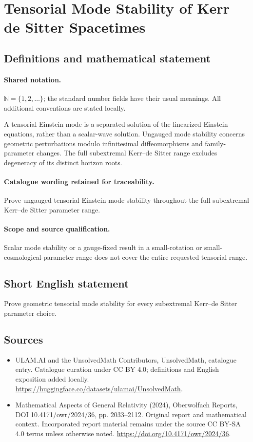 \documentclass[11pt]{article}
\begin{document}
\section{Tensorial Mode Stability of Kerr–de Sitter Spacetimes}\label{statement}

\subsection{Definitions and mathematical statement}

\paragraph{Shared notation.}$\mathbb N=\{1,2,\ldots\}$; the standard number fields have their usual meanings. All additional conventions are stated locally.


A tensorial Einstein mode is a separated solution of the linearized Einstein equations, rather than a scalar-wave solution. Ungauged mode stability concerns geometric perturbations modulo infinitesimal diffeomorphisms and family-parameter changes. The full subextremal Kerr--de Sitter range excludes degeneracy of its distinct horizon roots.

\paragraph{Catalogue wording retained for traceability.}
Prove ungauged tensorial Einstein mode stability throughout the full subextremal Kerr–de Sitter parameter range.

\paragraph{Scope and source qualification.}Scalar mode stability or a gauge-fixed result in a small-rotation or small-cosmological-parameter range does not cover the entire requested tensorial range.
\subsection{Short English statement}
Prove geometric tensorial mode stability for every subextremal Kerr--de Sitter parameter choice.
\subsection{Sources}
\begin{itemize}
\item[\hypertarget{source:statement:1}{S1}] ULAM.AI and the UnsolvedMath Contributors, UnsolvedMath, catalogue entry. Catalogue curation under CC BY 4.0; definitions and English exposition added locally.
\url{https://huggingface.co/datasets/ulamai/UnsolvedMath}.
\item[\hypertarget{source:statement:2}{S2}] Mathematical Aspects of General Relativity (2024), Oberwolfach Reports, DOI 10.4171/owr/2024/36, pp. 2033--2112. Original report and mathematical context. Incorporated report material remains under the source CC BY-SA 4.0 terms unless otherwise noted.
\url{https://doi.org/10.4171/owr/2024/36}.
\end{itemize}
\label{end:statement}
\end{document}
